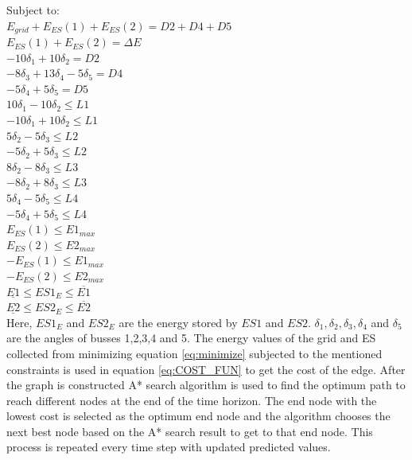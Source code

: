 \documentclass[journal,12pt,onecolumn]{IEEEtran}
\begin{document}
Subject to: \\
$E_{grid}+ E_{ES}(1)+E_{ES}(2) = D2+D4+D5$ \\
$E_{ES}(1)+E_{ES}(2) = \Delta E$ \\
$-10 \delta_1 + 10 \delta_2 = D2$\\
$-8 \delta_3 + 13 \delta_4 - 5\delta_5 = D4$\\
$-5 \delta_4 + 5 \delta_5 = D5$\\
$10 \delta_1 - 10 \delta_2 \leq L1$\\
$-10 \delta_1 + 10 \delta_2 \leq L1$\\
$5 \delta_2 - 5 \delta_3 \leq L2$\\
$-5 \delta_2 + 5 \delta_3 \leq L2$\\
$8 \delta_2 - 8 \delta_3 \leq L3$\\
$-8 \delta_2 + 8 \delta_3 \leq L3$\\
$5 \delta_4 - 5\delta_5 \leq L4$\\
$-5 \delta_4 + 5\delta_5 \leq L4$\\
$E_{ES}(1) \leq E1_{max}$\\
$E_{ES}(2) \leq E2_{max}$\\
$-E_{ES}(1) \leq E1_{max}$\\
$-E_{ES}(2) \leq E2_{max}$\\
$\underline{E1} \leq ES1_E \leq \overline{E1}$\\
$\underline{E2} \leq ES2_E \leq \overline{E2}$\\

Here, $ES1_E$ and $ES2_E$ are the energy stored by $ES1$ and $ES2$. $\delta_1, \delta_2, \delta_3, \delta_4$ and $\delta_5$ are the angles of busses 1,2,3,4 and 5. The energy values of the grid and ES collected from minimizing equation \ref{eq:minimize} subjected to the mentioned constraints is used in equation \ref{eq:COST_FUN} to get the cost of the edge. After the graph is constructed A* search algorithm is used to find the optimum path to reach different nodes at the end of the time horizon. The end node with the lowest cost is selected as the optimum end node and the algorithm chooses the next best node based on the A* search result to get to that end node. This process is repeated every time step with updated predicted values.




\end{document}
